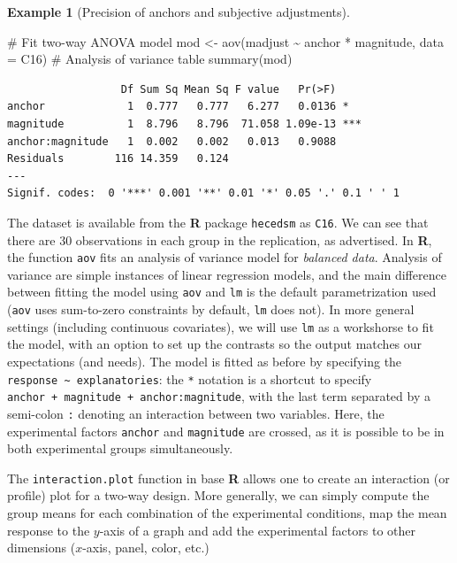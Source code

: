 \documentclass[
  11pt,
  letterpaper,
]{scrbook}
\newenvironment{Shaded}{\begin{snugshade}}{\end{snugshade}}
\newcommand{\AttributeTok}[1]{\textcolor[rgb]{0.40,0.45,0.13}{#1}}
\newcommand{\CommentTok}[1]{\textcolor[rgb]{0.37,0.37,0.37}{#1}}
\newcommand{\FunctionTok}[1]{\textcolor[rgb]{0.28,0.35,0.67}{#1}}
\newcommand{\NormalTok}[1]{\textcolor[rgb]{0.00,0.23,0.31}{#1}}
\newcommand{\OtherTok}[1]{\textcolor[rgb]{0.00,0.23,0.31}{#1}}
\newcommand{\SpecialCharTok}[1]{\textcolor[rgb]{0.37,0.37,0.37}{#1}}
\theoremstyle{definition}
\theoremstyle{definition}
\newtheorem{example}{Example}[chapter]
\theoremstyle{remark}
\begin{document}
\begin{example}[Precision of anchors and subjective
adjustments]
\begin{Shaded}
\begin{Highlighting}[]
\CommentTok{\# Fit two{-}way ANOVA model}
\NormalTok{mod }\OtherTok{\textless{}{-}} \FunctionTok{aov}\NormalTok{(madjust }\SpecialCharTok{\textasciitilde{}}\NormalTok{ anchor }\SpecialCharTok{*}\NormalTok{ magnitude,}
           \AttributeTok{data =}\NormalTok{ C16)}
\CommentTok{\# Analysis of variance table}
\FunctionTok{summary}\NormalTok{(mod)}
\end{Highlighting}
\end{Shaded}

\begin{verbatim}
                  Df Sum Sq Mean Sq F value   Pr(>F)    
anchor             1  0.777   0.777   6.277   0.0136 *  
magnitude          1  8.796   8.796  71.058 1.09e-13 ***
anchor:magnitude   1  0.002   0.002   0.013   0.9088    
Residuals        116 14.359   0.124                     
---
Signif. codes:  0 '***' 0.001 '**' 0.01 '*' 0.05 '.' 0.1 ' ' 1
\end{verbatim}

The dataset is available from the \textbf{R} package \texttt{hecedsm} as
\texttt{C16}. We can see that there are 30 observations in each group in
the replication, as advertised. In \textbf{R}, the function \texttt{aov}
fits an analysis of variance model for \emph{balanced data}. Analysis of
variance are simple instances of linear regression models, and the main
difference between fitting the model using \texttt{aov} and \texttt{lm}
is the default parametrization used (\texttt{aov} uses sum-to-zero
constraints by default, \texttt{lm} does not). In more general settings
(including continuous covariates), we will use \texttt{lm} as a
workshorse to fit the model, with an option to set up the contrasts so
the output matches our expectations (and needs). The model is fitted as
before by specifying the
\texttt{response\ \textasciitilde{}\ explanatories}: the \texttt{*}
notation is a shortcut to specify
\texttt{anchor\ +\ magnitude\ +\ anchor:magnitude}, with the last term
separated by a semi-colon \texttt{:} denoting an interaction between two
variables. Here, the experimental factors \texttt{anchor} and
\texttt{magnitude} are crossed, as it is possible to be in both
experimental groups simultaneously.

The \texttt{interaction.plot} function in base \textbf{R} allows one to
create an interaction (or profile) plot for a two-way design. More
generally, we can simply compute the group means for each combination of
the experimental conditions, map the mean response to the \(y\)-axis of
a graph and add the experimental factors to other dimensions
(\(x\)-axis, panel, color, etc.)


\end{example}
\end{document}
